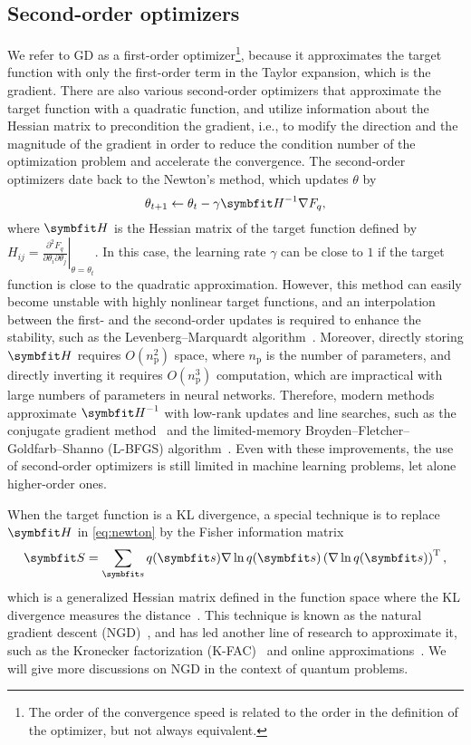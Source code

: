 \subsection{Second-order optimizers}

We refer to GD as a first-order optimizer\footnote{The order of the convergence speed is related to the order in the definition of the optimizer, but not always equivalent.}, because it approximates the target function with only the first-order term in the Taylor expansion, which is the gradient. There are also various second-order optimizers that approximate the target function with a quadratic function, and utilize information about the Hessian matrix to precondition the gradient, i.e., to modify the direction and the magnitude of the gradient in order to reduce the condition number of the optimization problem and accelerate the convergence. The second-order optimizers date back to the Newton's method, which updates $\theta$ by
\begin{equation}
\theta_{t + 1} \gets \theta_t - \gamma \mH^{-1} \nabla F_q,
\label{eq:newton}
\end{equation}
where $\mH$ is the Hessian matrix of the target function defined by $H_{i j} = \left.\frac{\partial^2 F_q}{\partial \theta_i \partial \theta_j}\right|_{\theta = \theta_t}$. In this case, the learning rate $\gamma$ can be close to $1$ if the target function is close to the quadratic approximation. However, this method can easily become unstable with highly nonlinear target functions, and an interpolation between the first- and the second-order updates is required to enhance the stability, such as the Levenberg--Marquardt algorithm~\cite{levenberg1944method}. Moreover, directly storing $\mH$ requires $O(n_\text{p}^2)$ space, where $n_\text{p}$ is the number of parameters, and directly inverting it requires $O(n_\text{p}^3)$ computation, which are impractical with large numbers of parameters in neural networks. Therefore, modern methods approximate $\mH^{-1}$ with low-rank updates and line searches, such as the conjugate gradient method~\cite{fletcher1964function} and the limited-memory Broyden--Fletcher--Goldfarb--Shanno (L-BFGS) algorithm~\cite{liu1989limited}. Even with these improvements, the use of second-order optimizers is still limited in machine learning problems, let alone higher-order ones.

When the target function is a KL divergence, a special technique is to replace $\mH$ in \cref{eq:newton} by the Fisher information matrix
\begin{equation}
\mS = \sum_\vs q(\vs) \nabla \ln q(\vs) \left( \nabla \ln q(\vs) \right)^\transpose,
\end{equation}
which is a generalized Hessian matrix defined in the function space where the KL divergence measures the distance~\cite{martens2020new}. This technique is known as the natural gradient descent (NGD)~\cite{amari1998natural}, and has led another line of research to approximate it, such as the Kronecker factorization (K-FAC)~\cite{martens2015optimizing} and online approximations~\cite{roux2007topmoumoute, ollivier2017true}. We will give more discussions on NGD in the context of quantum problems. 

